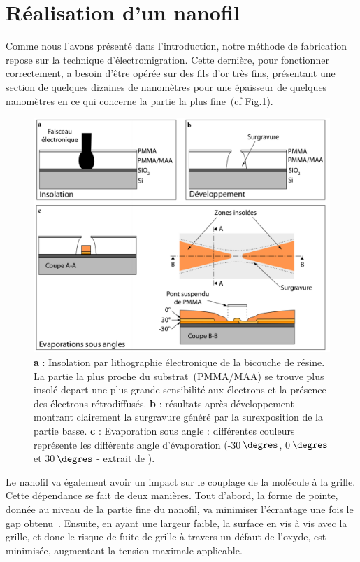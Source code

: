 \section{Réalisation d'un nanofil}
Comme nous l'avons présenté dans l'introduction, notre méthode de fabrication repose sur la technique d'électromigration. Cette dernière, pour fonctionner correctement, a besoin d'\^etre opérée sur des fils d'or très fins, présentant une section de quelques dizaines de nanomètres pour une épaisseur de quelques nanomètres en ce qui concerne la partie la plus fine~(cf Fig.\ref{EvapAngle}). 

\begin{figure}[h!]
\centering \includegraphics[scale=0.45]{Fabrication/EvapAngle/EvapAngle.pdf}
\caption{\textbf{a} : Insolation par lithographie électronique de la bicouche de résine. La partie la plus proche du substrat~(PMMA/MAA) se trouve plus insolé depart une plus grande sensibilité aux électrons et la présence des électrons rétrodiffusés. \textbf{b} : résultats après développement montrant clairement la surgravure généré par la surexposition de la partie basse. \textbf{c} : Evaporation sous angle : différentes couleurs représente les différents angle d'évaporation (-30$\,\degres$, 0$\,\degres$ et 30$\,\degres$ - extrait de \cite{RochPhD}).}
\label{EvapAngle}
\end{figure}

Le nanofil va également avoir un impact sur le couplage de la molécule à la grille. Cette dépendance se fait de deux manières. Tout d'abord, la forme de pointe, donnée au niveau de la partie fine du nanofil, va minimiser l'écrantage une fois le gap obtenu~\cite{Datta2009}. Ensuite, en ayant une largeur faible, la surface en vis à vis avec la grille, et donc le risque de fuite de grille à travers un défaut de l'oxyde, est minimisée, augmentant la tension maximale applicable.

